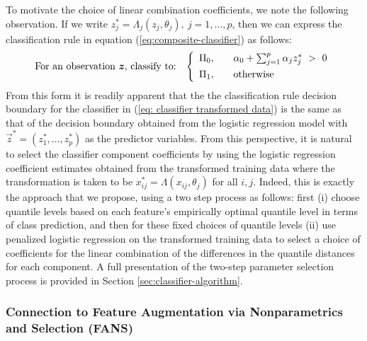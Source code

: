 To motivate the choice of linear combination coefficients, we note the following
observation.  If we write
$z_j^{*} = \Lambda_j (z_j, \theta_j),~ j = 1, \dots, p$, then we can express the
classification rule in equation (\ref{eq:composite-classifier}) as follows:
\begin{equation}
  \label{eq: classifier transformed data}
  \text{For an observation $\vec{z}$, classify to:} \hspace{3mm} \left\{ 
    \begin{array}{lcl}
      \Pi_0, & & \alpha_0 + \sum_{j = 1}^p \alpha_j z_j^{*} ~>~ 0 \\[1ex]
      \Pi_1, & & \text{otherwise} \\[0ex]
    \end{array}
  \right.
\end{equation}
From this form it is readily apparent that the the classification rule decision
boundary for the classifier in (\ref{eq: classifier transformed data}) is the
same as that of the decision boundary obtained from the logistic regression
model with $\vec{z}^{*} = (z_1^{*}, \dots, z_p^{*})$ as the predictor variables.
From this perspective, it is natural to select the classifier component
coefficients by using the logistic regression coefficient estimates obtained
from the transformed training data where the transformation is taken to be
$x_{ij}^{*} = \Lambda(x_{ij}, \theta_j)$ for all $i, j$.  Indeed, this is
exactly the approach that we propose, using a two step process as follows: first
(i) choose quantile levels based on each feature's empirically optimal quantile
level in terms of class prediction, and then for these fixed choices of quantile
levels (ii) use penalized logistic regression on the transformed training data
to select a choice of coefficients for the linear combination of the differences
in the quantile distances for each component.  A full presentation of the
two-step parameter selection process is provided in Section
\ref{sec:classifier-algorithm}.




\subsubsection{Connection to Feature Augmentation via Nonparametrics and
  Selection (FANS)}
\label{sec:similarites-to-fans}

